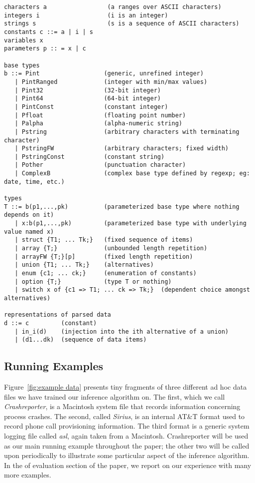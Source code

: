 \begin {figure*}
\begin {verbatim}
characters a                 (a ranges over ASCII characters)
integers i                   (i is an integer)
strings s                    (s is a sequence of ASCII characters)
constants c ::= a | i | s
variables x
parameters p :: = x | c

base types
b ::= Pint                  (generic, unrefined integer)
   | PintRanged             (integer with min/max values)
   | Pint32                 (32-bit integer)
   | Pint64                 (64-bit integer)
   | PintConst              (constant integer)
   | Pfloat                 (floating point number)
   | Palpha                 (alpha-numeric string)
   | Pstring                (arbitrary characters with terminating character)
   | PstringFW              (arbitrary characters; fixed width)
   | PstringConst           (constant string)
   | Pother                 (punctuation character)
   | ComplexB               (complex base type defined by regexp; eg: date, time, etc.)

types
T ::= b(p1,...,pk)          (parameterized base type where nothing depends on it)
   | x:b(p1,...,pk)         (parameterized base type with underlying value named x)     
   | struct {T1; ... Tk;}   (fixed sequence of items)
   | array {T;}             (unbounded length repetition)
   | arrayFW {T;}[p]        (fixed length repetition) 
   | union {T1; ... Tk;}    (alternatives)
   | enum {c1; ... ck;}     (enumeration of constants)
   | option {T;}            (type T or nothing)
   | switch x of {c1 => T1; ... ck => Tk;}  (dependent choice amongst alternatives)

representations of parsed data
d ::= c         (constant)
   | in_i(d)    (injection into the ith alternative of a union)
   | (d1...dk)  (sequence of data items)

\end{verbatim}
\caption {Selected elements of the \ir{}.  Note: formatting needed.}
\label{fig:ir}
\end{figure*}

\subsection{Running Examples}

Figure~\ref{fig:example data} presents tiny fragments of three
different ad hoc data files we have trained our inference algorithm
on.  The first, which we call {\em Crashreporter}, is a Macintosh
system file that records information concerning process crashes. The
second, called {\em Sirius}, is an internal AT\&T format used to
record phone call provisioning information. The third format is
a generic system logging file called {\em asl}, again taken from a
Macintosh.
Crashreporter will be used as our main running example throughout the
paper; the other two will be called upon periodically to illustrate
some particular aspect of the inference algorithm.  In the 
of evaluation section of the paper, we report on our experience
with many more examples.


